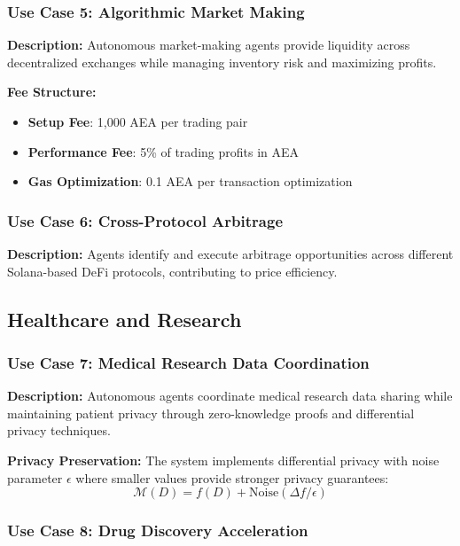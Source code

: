 \documentclass[12pt,a4paper]{article}
\begin{document}
\subsubsection{Use Case 5: Algorithmic Market Making}

\textbf{Description:} Autonomous market-making agents provide liquidity across decentralized exchanges while managing inventory risk and maximizing profits.

\textbf{Fee Structure:}
\begin{itemize}
\item \textbf{Setup Fee}: 1,000 AEA per trading pair
\item \textbf{Performance Fee}: 5\% of trading profits in AEA
\item \textbf{Gas Optimization}: 0.1 AEA per transaction optimization
\end{itemize}

\subsubsection{Use Case 6: Cross-Protocol Arbitrage}

\textbf{Description:} Agents identify and execute arbitrage opportunities across different Solana-based DeFi protocols, contributing to price efficiency.

\subsection{Healthcare and Research}

\subsubsection{Use Case 7: Medical Research Data Coordination}

\textbf{Description:} Autonomous agents coordinate medical research data sharing while maintaining patient privacy through zero-knowledge proofs and differential privacy techniques.

\textbf{Privacy Preservation:}
The system implements differential privacy with noise parameter $\epsilon$ where smaller values provide stronger privacy guarantees:
$$\mathcal{M}(D) = f(D) + \text{Noise}(\Delta f / \epsilon)$$

\subsubsection{Use Case 8: Drug Discovery Acceleration}
\end{document}
